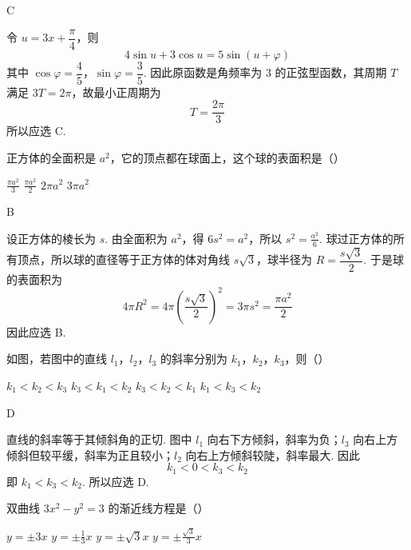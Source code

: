 \begin{answer}
C
\end{answer}

\begin{solution}
令 \(u=3x+\dfrac{\pi}{4}\)，则
\[
4\sin u+3\cos u=5\sin\left(u+\varphi\right)
\]
其中 \(\cos\varphi=\dfrac45\)，\(\sin\varphi=\dfrac35\). 因此原函数是角频率为 \(3\) 的正弦型函数，其周期 \(T\) 满足 \(3T=2\pi\)，故最小正周期为
\[
T=\frac{2\pi}{3}
\]
所以应选 C.
\end{solution}

\begin{problem}
正方体的全面积是 \(a^2\)，它的顶点都在球面上，这个球的表面积是（\quad）

\choices
    {\(\frac{\pi a^2}{3}\)}
    {\(\frac{\pi a^2}{2}\)}
    {\(2\pi a^{2}\)}
    {\(3\pi a^{2}\)}
\end{problem}

\begin{answer}
B
\end{answer}

\begin{solution}
设正方体的棱长为 \(s\). 由全面积为 \(a^2\)，得 \(6s^2=a^2\)，所以 \(s^2=\frac{a^2}{6}\).
球过正方体的所有顶点，所以球的直径等于正方体的体对角线 \(s\sqrt3\)，球半径为 \(R=\dfrac{s\sqrt3}{2}\). 于是球的表面积为
\[
4\pi R^2=4\pi\left(\frac{s\sqrt3}{2}\right)^2=3\pi s^2=\frac{\pi a^2}{2}
\]
因此应选 B.
\end{solution}

\begin{problem}
如图，若图中的直线 \(l_{1}\)，\(l_{2}\)，\(l_{3}\) 的斜率分别为 \(k_{1}\)，\(k_{2}\)，\(k_{3}\)，则（\quad）


\choices
    {\(k_{1} < k_{2} < k_{3}\)}
    {\(k_{3} < k_{1} < k_{2}\)}
    {\(k_{3} < k_{2} < k_{1}\)}
    {\(k_{1} < k_{3} < k_{2}\)}
\end{problem}

\begin{answer}
D
\end{answer}

\begin{solution}
直线的斜率等于其倾斜角的正切. 图中 \(l_1\) 向右下方倾斜，斜率为负；\(l_3\) 向右上方倾斜但较平缓，斜率为正且较小；\(l_2\) 向右上方倾斜较陡，斜率最大. 因此
\[
k_1<0<k_3<k_2
\]
即 \(k_1<k_3<k_2\). 所以应选 D.
\end{solution}

\begin{problem}
双曲线 \(3x^{2} - y^{2} = 3\) 的渐近线方程是（\quad）

\choices
    {\(y = \pm 3x\)}
    {\(y = \pm \frac{1}{3} x\)}
    {\(y = \pm \sqrt{3} x\)}
    {\(y = \pm \frac{\sqrt{3}}{3} x\)}
\end{problem}

